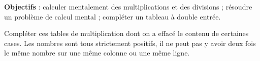 \begin{activite}
    \begin{changemargin}{-10mm}{-10mm}
    {\bf Objectifs} : calculer mentalement des multiplications et des divisions ; résoudre un problème de calcul mental ; compléter un tableau à double entrée.

    Compléter ces tables de multiplication dont on a effacé le contenu de certaines cases. Les nombres sont tous strictement positifs, il ne peut pas y avoir deux fois le même nombre sur une même colonne ou une même ligne. \medskip
    {\renewcommand{\arraystretch}{1.8}
       \hfill
       \hfill
       \hfill
       \hfill
       \hspace*{1cm} \\
          
}
\end{changemargin}
\end{activite}
